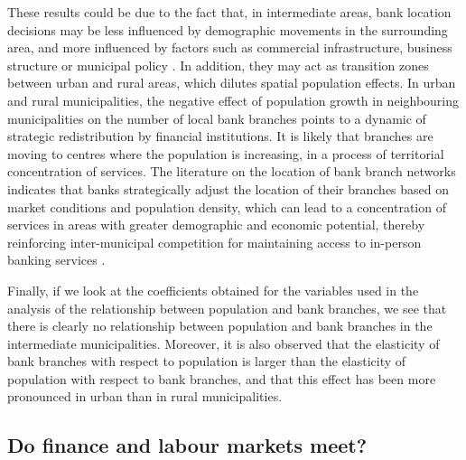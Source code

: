 \documentclass[a4paper,11pt,oneside]{article}
\begin{document}
These results could be due to the fact that, in intermediate areas, bank location decisions may be less influenced by demographic movements in the surrounding area, and more influenced by factors such as commercial infrastructure, business structure or municipal policy \citep[e.g.,][]{zhang2021determinants}. In addition, they may act as transition zones between urban and rural areas, which dilutes spatial population effects. In urban and rural municipalities, the negative effect of population growth in neighbouring municipalities on the number of local bank branches points to a dynamic of strategic redistribution by financial institutions. It is likely that branches are moving to centres where the population is increasing, in a process of territorial concentration of services. The literature on the location of bank branch networks indicates that banks strategically adjust the location of their branches based on market conditions and population density, which can lead to a concentration of services in areas with greater demographic and economic potential, thereby reinforcing inter-municipal competition for maintaining access to in-person banking services \citep{llorens2020productivity,qi2024move}.







Finally, if we look at the coefficients obtained for the variables used in the analysis of the relationship between population and bank branches, we see that there is clearly no relationship between population and bank branches in the intermediate municipalities. Moreover, it is also observed that the elasticity of bank branches with respect to
population is larger than the elasticity of population with respect to bank branches, and that this effect has been more pronounced in urban than in rural municipalities.




\subsection{Do finance and labour markets meet?}
\label{sec:finance_labour_markets}
\end{document}
